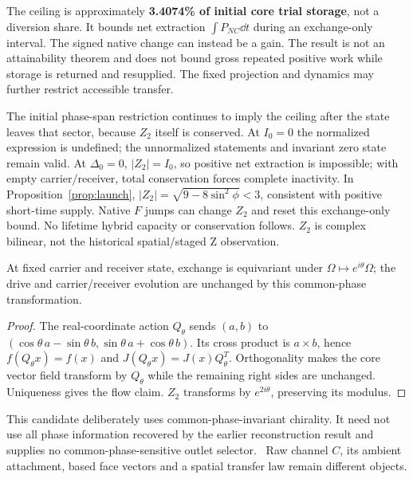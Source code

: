 The ceiling is approximately \textbf{3.4074\% of initial core trial storage}, not a diversion share. It bounds net extraction $\int P_{NC}\dd t$ during an exchange-only interval. The signed native change can instead be a gain. The result is not an attainability theorem and does not bound gross repeated positive work while storage is returned and resupplied. The fixed projection and dynamics may further restrict accessible transfer.

The initial phase-span restriction continues to imply the ceiling after the state leaves that sector, because $Z_2$ itself is conserved. At $I_0=0$ the normalized expression is undefined; the unnormalized statements and invariant zero state remain valid. At $\Delta_0=0$, $|Z_2|=I_0$, so positive net extraction is impossible; with empty carrier/receiver, total conservation forces complete inactivity. In Proposition~\ref{prop:launch}, $|Z_2|=\sqrt{9-8\sin^2\phi}<3$, consistent with positive short-time supply. Native $F$ jumps can change $Z_2$ and reset this exchange-only bound. No lifetime hybrid capacity or conservation follows. $Z_2$ is complex bilinear, not the historical spatial/staged Z observation.

\begin{proposition}\label{prop:phase}
At fixed carrier and receiver state, exchange is equivariant under $\Omega\mapsto e^{i\theta}\Omega$; the drive and carrier/receiver evolution are unchanged by this common-phase transformation.
\end{proposition}
\begin{proof}
The real-coordinate action $Q_\theta$ sends $(a,b)$ to $(\cos\theta\,a-\sin\theta\,b,\sin\theta\,a+\cos\theta\,b)$. Its cross product is $a\times b$, hence $f(Q_\theta x)=f(x)$ and $J(Q_\theta x)=J(x)Q_\theta^T$. Orthogonality makes the core vector field transform by $Q_\theta$ while the remaining right sides are unchanged. Uniqueness gives the flow claim. $Z_2$ transforms by $e^{2i\theta}$, preserving its modulus.
\end{proof}
This candidate deliberately uses common-phase-invariant chirality. It need not use all phase information recovered by the earlier reconstruction result and supplies no common-phase-sensitive outlet selector.~\cite{recirculation} Raw channel $C$, its ambient attachment, based face vectors and a spatial transfer law remain different objects.
